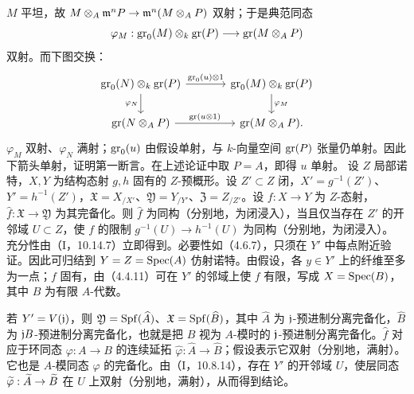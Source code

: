 $M$ 平坦，故 $M\otimes_A\mathfrak m^nP\to\mathfrak m^n(M\otimes_AP)$ 双射；于是典范同态
\[
\varphi_M:\operatorname{gr}_0(M)\otimes_k\operatorname{gr}(P)\longrightarrow\operatorname{gr}(M\otimes_AP)
\]
双射。而下图交换：
\[
\begin{tikzcd}[column sep=large]
\gr_0(N)\otimes_k\gr(P)\arrow[r,"\gr_0(u)\otimes1"]\arrow[d,"\varphi_N"']&\gr_0(M)\otimes_k\gr(P)\arrow[d,"\varphi_M"]\\
\gr(N\otimes_AP)\arrow[r,"\gr(u\otimes1)"]&\gr(M\otimes_AP).
\end{tikzcd}
\]
$\varphi_M$ 双射、$\varphi_N$ 满射；$\operatorname{gr}_0(u)$ 由假设单射，与 $k$-向量空间 $\operatorname{gr}(P)$ 张量仍单射。因此下箭头单射，证明第一断言。在上述论证中取 $P=A$，即得 $u$ 单射。\finishproof
{}
设 $Z$ 局部诺特，$X,Y$ 为结构态射 $g,h$ 固有的 $Z$-预概形。设 $Z'\subset Z$ 闭，$X'=g^{-1}(Z')$、$Y'=h^{-1}(Z')$，$\mathfrak X=X_{/X'}$、$\mathfrak Y=Y_{/Y'}$、$\mathfrak Z=Z_{/Z'}$。设 $f:X\to Y$ 为 $Z$-态射，$\widehat f:\mathfrak X\to\mathfrak Y$ 为其完备化。则 $\widehat f$ 为同构（分别地，为闭浸入），当且仅当存在 $Z'$ 的开邻域 $U\subset Z$，使 $f$ 的限制 $g^{-1}(U)\to h^{-1}(U)$ 为同构（分别地，为闭浸入）。
\eproof
充分性由（I，10.14.7）立即得到。必要性如（4.6.7），只须在 $Y'$ 中每点附近验证。因此可归结到 $Y=Z=\operatorname{Spec}(A)$ 仿射诺特。由假设，各 $y\in Y'$ 上的纤维至多为一点；$f$ 固有，由（4.4.11）可在 $Y'$ 的邻域上使 $f$ 有限，写成 $X=\operatorname{Spec}(B)$，其中 $B$ 为有限 $A$-代数。

若 $Y'=V(\mathfrak j)$，则 $\mathfrak Y=\operatorname{Spf}(\widehat A)$、$\mathfrak X=\operatorname{Spf}(\widehat B)$，其中 $\widehat A$ 为 $\mathfrak j$-预进制分离完备化，$\widehat B$ 为 $\mathfrak j B$-预进制分离完备化，也就是把 $B$ 视为 $A$-模时的 $\mathfrak j$-预进制分离完备化。$\widehat f$ 对应于环同态 $\varphi:A\to B$ 的连续延拓 $\widehat\varphi:\widehat A\to\widehat B$；假设表示它双射（分别地，满射）。它也是 $A$-模同态 $\varphi$ 的完备化。由（I，10.8.14），存在 $Y'$ 的开邻域 $U$，使层同态 $\widetilde{\varphi}:\widetilde{A}\to\widetilde{B}$ 在 $U$ 上双射（分别地，满射），从而得到结论。\finishproof\par

